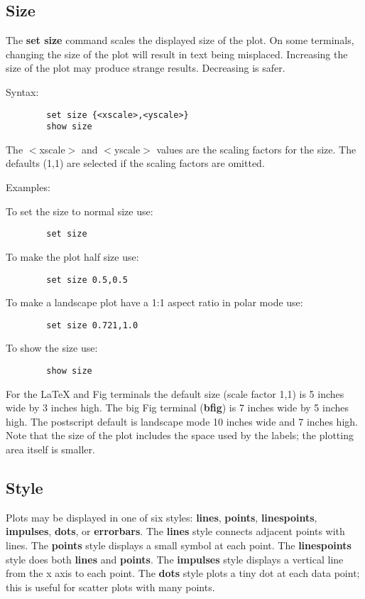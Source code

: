 \subsection{Size}
The {\bf set size} command scales the displayed size of the plot.  On some
terminals, changing the size of the plot will result in text being
misplaced. Increasing the size of the plot may produce strange
results. Decreasing is safer.

Syntax:

\begin{verbatim}
        set size {<xscale>,<yscale>}
        show size
\end{verbatim}

The $<$xscale$>$ and $<$yscale$>$ values are the scaling factors for the size.
The defaults (1,1) are selected if the scaling factors are omitted.

Examples: 

To set the size to normal size use:
\begin{verbatim}
        set size
\end{verbatim}
To make the plot half size use:
\begin{verbatim}
        set size 0.5,0.5
\end{verbatim}
To make a landscape plot have a 1:1 aspect ratio in polar mode use:
\begin{verbatim}
        set size 0.721,1.0
\end{verbatim}
To show the size use:
\begin{verbatim}
        show size
\end{verbatim}

For the LaTeX and Fig terminals the default size (scale factor 1,1)
is 5 inches wide by 3 inches high. The big Fig terminal ({\bf bfig}) is 7
inches wide by 5 inches high. The postscript default is landscape mode
10 inches wide and 7 inches high. 
Note that the size of the plot includes the space used by the labels; 
the plotting area itself is smaller. 
\subsection{Style}
Plots may be displayed in one of six styles: {\bf lines}, {\bf points},
{\bf linespoints}, {\bf impulses}, {\bf dots}, or {\bf errorbars}. The {\bf lines} style
connects adjacent points with lines. The {\bf points} style displays a
small symbol at each point. The {\bf linespoints} style does both
{\bf lines} and {\bf points}. The {\bf impulses} style displays a vertical line
from the x axis to each point. The {\bf dots} style plots a tiny dot at
each data point; this is useful for scatter plots with many points.

